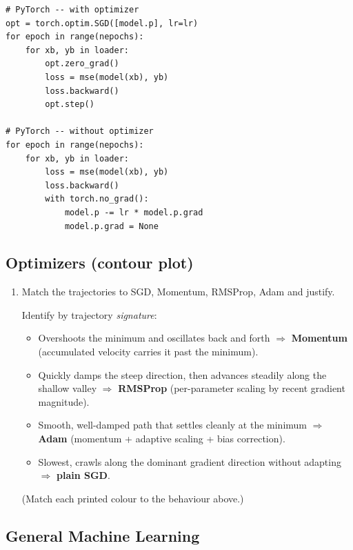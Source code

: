 \documentclass[10pt,a4paper]{article}
\newcommand{\q}[1]{\item #1}
\begin{document}
\begin{enumerate}[leftmargin=*,label=\textbf{Q\arabic*.}]
\begin{verbatim}
# PyTorch -- with optimizer
opt = torch.optim.SGD([model.p], lr=lr)
for epoch in range(nepochs):
    for xb, yb in loader:
        opt.zero_grad()
        loss = mse(model(xb), yb)
        loss.backward()
        opt.step()

# PyTorch -- without optimizer
for epoch in range(nepochs):
    for xb, yb in loader:
        loss = mse(model(xb), yb)
        loss.backward()
        with torch.no_grad():
            model.p -= lr * model.p.grad
            model.p.grad = None
\end{verbatim}

\end{enumerate}

\subsection{Optimizers (contour plot)}

\begin{enumerate}[leftmargin=*,label=\textbf{Q\arabic*.}]

\q Match the trajectories to SGD, Momentum, RMSProp, Adam and justify.
\begin{answerbox}
Identify by trajectory \emph{signature}:
\begin{itemize}[leftmargin=*,nosep]
\item Overshoots the minimum and oscillates back and forth $\Rightarrow$ \textbf{Momentum} (accumulated velocity carries it past the minimum).
\item Quickly damps the steep direction, then advances steadily along the shallow valley $\Rightarrow$ \textbf{RMSProp} (per-parameter scaling by recent gradient magnitude).
\item Smooth, well-damped path that settles cleanly at the minimum $\Rightarrow$ \textbf{Adam} (momentum + adaptive scaling + bias correction).
\item Slowest, crawls along the dominant gradient direction without adapting $\Rightarrow$ \textbf{plain SGD}.
\end{itemize}
(Match each printed colour to the behaviour above.)
\end{answerbox}

\end{enumerate}

\subsection{General Machine Learning}
\end{document}
